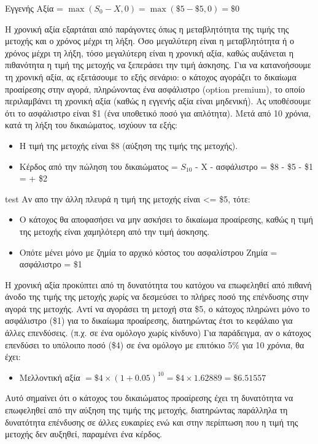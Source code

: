 Εγγενής Αξία = $\max(S_0 - X, 0) = \max(\$5 - \$5, 0) = \$0$

Η χρονική αξία εξαρτάται από παράγοντες όπως η μεταβλητότητα της τιμής της μετοχής και ο χρόνος μέχρι τη λήξη.
Όσο μεγαλύτερη είναι η μεταβλητότητα ή ο χρόνος μέχρι τη λήξη, τόσο μεγαλύτερη είναι η χρονική αξία, καθώς αυξάνεται η πιθανότητα η τιμή της μετοχής να ξεπεράσει την τιμή άσκησης.
Για να κατανοήσουμε τη χρονική αξία, ας εξετάσουμε το εξής σενάριο: ο κάτοχος αγοράζει το δικαίωμα προαίρεσης στην αγορά,
πληρώνοντας ένα ασφάλιστρο (option premium), το οποίο περιλαμβάνει τη χρονική αξία (καθώς η εγγενής αξία είναι μηδενική). Ας υποθέσουμε ότι το ασφάλιστρο είναι \$1 (ένα υποθετικό ποσό για απλότητα).
Μετά από 10 χρόνια, κατά τη λήξη του δικαιώματος, ισχύουν τα εξής:
\begin{itemize}
    \item Η τιμή της μετοχής είναι \$8 (αύξηση της τιμής της μετοχής).
    \item Κέρδος από την πώληση του δικαιώματος = $S_{10}$ - X - ασφάλιστρο = \$8 - \$5 - \$1 = + \$2
\end{itemize}

 test
Αν απο την άλλη πλευρά η τιμή της μετοχής είναι <= \$5, τότε:
\begin{itemize}
    \item Ο κάτοχος θα αποφασήσει να μην ασκήσει το δικαίωμα προαίρεσης, καθώς η τιμή της μετοχής είναι χαμηλότερη από την τιμή άσκησης.
    \item Οπότε μένει μόνο με ζημία το αρχικό κόστος του ασφαλίστρου Ζημία = ασφάλιστρο = \$1
\end{itemize}

Η χρονική αξία προκύπτει από τη δυνατότητα του κατόχου να επωφεληθεί από πιθανή άνοδο της τιμής της μετοχής χωρίς να δεσμεύσει το πλήρες ποσό της επένδυσης στην αγορά της μετοχής.
Αντί να αγοράσει τη μετοχή στα \$5, ο κάτοχος πληρώνει μόνο το ασφάλιστρο (\$1) για το δικαίωμα προαίρεσης, διατηρώντας έτσι το κεφάλαιο για άλλες επενδύσεις. (π.χ. σε ένα ομόλογο χωρίς κίνδυνο)
Για παράδειγμα, αν ο κάτοχος επενδύσει το υπόλοιπο ποσό (\$4) σε ένα ομόλογο με επιτόκιο 5\% για 10 χρόνια, θα έχει:
\begin{itemize}
    \item Μελλοντική αξία \( = \$4 \times (1 + 0.05)^{10} = \$4 \times 1.62889 = \$6.51557 \)
\end{itemize}

Αυτό σημαίνει ότι ο κάτοχος του δικαιώματος προαίρεσης έχει τη δυνατότητα να επωφεληθεί από την αύξηση της τιμής της μετοχής, διατηρώντας παράλληλα τη δυνατότητα επένδυσης σε άλλες ευκαιρίες
ενώ και στην περίπτωση που η τιμή της μετοχής δεν αυξηθεί, παραμένει ένα κέρδος.

